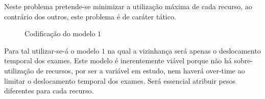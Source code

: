 Neste problema pretende-se minimizar a utilização máxima de cada recurso, ao contrário dos outros, este problema é de caráter tático.\\

\begin{figure}[h]
    \centering
    \makebox[\textwidth][c]{%
        \texttt{[image: P3M1]}
    }
    \caption{Codificação do modelo $1$}
    \label{fig:cod_prob3_mod1}
\end{figure}

Para tal utilizar-se-á o modelo $1$ na qual a vizinhança será apenas o deslocamento temporal dos exames. Este modelo é inerentemente viável porque não há sobre-utilização de recursos, por ser a variável em estudo, nem haverá over-time ao limitar o deslocamento temporal dos exames. Será essencial atribuir pesos diferentes para cada recurso.\\


